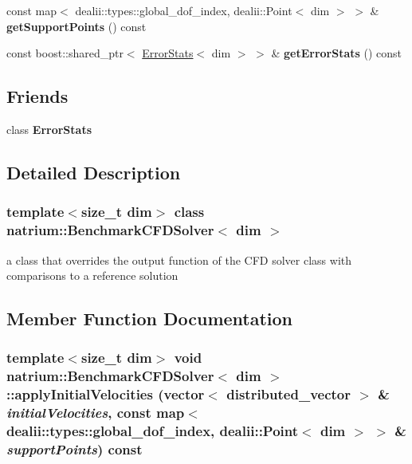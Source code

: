 \begin{DoxyCompactItemize}
\item 
\hypertarget{classnatrium_1_1BenchmarkCFDSolver_a659524b149a3650b0f62186e59e385ec}{
const map$<$ dealii::types::global\_\-dof\_\-index, dealii::Point$<$ dim $>$ $>$ \& {\bfseries getSupportPoints} () const }
\label{classnatrium_1_1BenchmarkCFDSolver_a659524b149a3650b0f62186e59e385ec}

\item 
\hypertarget{classnatrium_1_1BenchmarkCFDSolver_abb3b4536d852415a4051c52507514ac2}{
const boost::shared\_\-ptr$<$ \hyperlink{classnatrium_1_1ErrorStats}{ErrorStats}$<$ dim $>$ $>$ \& {\bfseries getErrorStats} () const }
\label{classnatrium_1_1BenchmarkCFDSolver_abb3b4536d852415a4051c52507514ac2}

\end{DoxyCompactItemize}
\subsection*{Friends}
\begin{DoxyCompactItemize}
\item 
\hypertarget{classnatrium_1_1BenchmarkCFDSolver_a168e52694e19bf5c3e3136236b7b6888}{
class {\bfseries ErrorStats}}
\label{classnatrium_1_1BenchmarkCFDSolver_a168e52694e19bf5c3e3136236b7b6888}

\end{DoxyCompactItemize}


\subsection{Detailed Description}
\subsubsection*{template$<$size\_\-t dim$>$ class natrium::BenchmarkCFDSolver$<$ dim $>$}

a class that overrides the output function of the CFD solver class with comparisons to a reference solution 

\subsection{Member Function Documentation}
\hypertarget{classnatrium_1_1BenchmarkCFDSolver_a7883dcfd4469ae65ae62cad09ae5d160}{
\subsubsection[{applyInitialVelocities}]{\setlength{\rightskip}{0pt plus 5cm}template$<$size\_\-t dim$>$ void {\bf natrium::BenchmarkCFDSolver}$<$ dim $>$::applyInitialVelocities (vector$<$ {\bf distributed\_\-vector} $>$ \& {\em initialVelocities}, \/  const map$<$ dealii::types::global\_\-dof\_\-index, dealii::Point$<$ dim $>$ $>$ \& {\em supportPoints}) const}}
\label{classnatrium_1_1BenchmarkCFDSolver_a7883dcfd4469ae65ae62cad09ae5d160}


